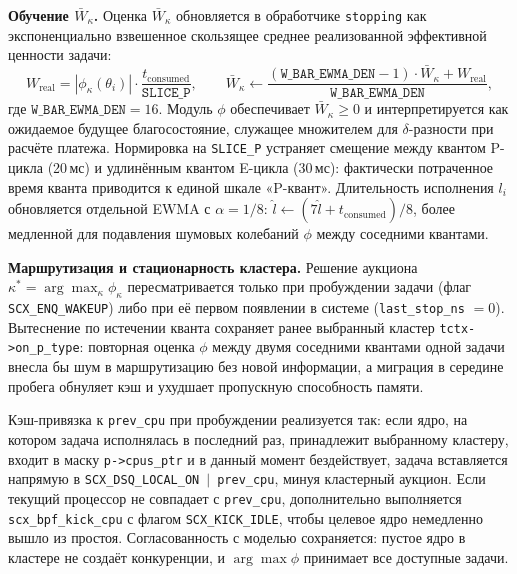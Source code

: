 \documentclass[14pt, oneside]{extbook}
\begin{document}
        \textbf{Обучение $\bar W_\kappa$.}
        Оценка $\bar W_\kappa$ обновляется в обработчике
        \texttt{stopping} как экспоненциально взвешенное
        скользящее среднее реализованной эффективной ценности
        задачи:
        \[
                W_{\mathrm{real}} = |\phi_\kappa(\theta_i)| \cdot
                \frac{t_{\mathrm{consumed}}}{\texttt{SLICE\_P}},
                \qquad
                \bar W_\kappa \leftarrow
                \frac{(\texttt{W\_BAR\_EWMA\_DEN} - 1) \cdot
                \bar W_\kappa + W_{\mathrm{real}}}
                {\texttt{W\_BAR\_EWMA\_DEN}},
        \]
        где $\texttt{W\_BAR\_EWMA\_DEN} = 16$. Модуль $\phi$
        обеспечивает $\bar W_\kappa \geq 0$ и интерпретируется
        как ожидаемое будущее благосостояние, служащее
        множителем для $\delta$-разности при расчёте платежа.
        Нормировка на \texttt{SLICE\_P} устраняет смещение
        между квантом P-цикла (20\,мс) и удлинённым квантом
        E-цикла (30\,мс): фактически потраченное время кванта
        приводится к единой шкале «P-квант». Длительность
        исполнения $l_i$ обновляется отдельной EWMA с
        $\alpha = 1/8$:
        $\hat l \leftarrow (7 \hat l + t_{\mathrm{consumed}})/8$,
        более медленной для подавления шумовых колебаний $\phi$
        между соседними квантами.

        \textbf{Маршрутизация и стационарность кластера.}
        Решение аукциона
        $\kappa^* = \arg\max_\kappa \phi_\kappa$
        пересматривается только при пробуждении задачи (флаг
        \texttt{SCX\_ENQ\_WAKEUP}) либо при её первом появлении
        в системе (\texttt{last\_stop\_ns} $= 0$). Вытеснение
        по истечении кванта сохраняет
        ранее выбранный кластер
        \texttt{tctx->on\_p\_type}: повторная оценка $\phi$
        между двумя соседними квантами одной задачи внесла бы
        шум в маршрутизацию без новой информации, а миграция
        в середине пробега обнуляет кэш и ухудшает пропускную
        способность памяти.

        Кэш-привязка к \texttt{prev\_cpu} при пробуждении
        реализуется так: если ядро, на котором задача
        исполнялась в последний раз, принадлежит выбранному
        кластеру, входит в маску
        \texttt{p->cpus\_ptr} и в данный момент бездействует,
        задача вставляется напрямую в
        \texttt{SCX\_DSQ\_LOCAL\_ON} $\,\vert\,$
        \texttt{prev\_cpu}, минуя кластерный аукцион. Если
        текущий процессор не совпадает с \texttt{prev\_cpu},
        дополнительно выполняется
        \texttt{scx\_bpf\_kick\_cpu} с флагом
        \texttt{SCX\_KICK\_IDLE}, чтобы целевое ядро
        немедленно вышло из простоя. Согласованность с
        моделью сохраняется: пустое ядро в кластере не
        создаёт конкуренции, и $\arg\max\phi$ принимает все
        доступные задачи.
\end{document}
